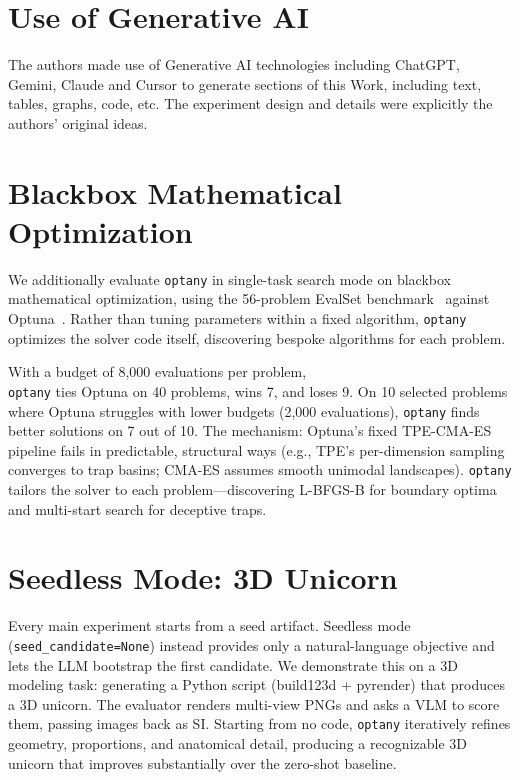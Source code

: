 \documentclass[sigconf,anonymous,review]{acmart}
\newcommand{\oa}{\texttt{optany}}
\newcommand{\asi}{SI}
\begin{document}
\newpage

\appendix

\section{Use of Generative AI}
The authors made use of Generative AI technologies including ChatGPT, Gemini, Claude and Cursor to generate sections of this Work, including text, tables, graphs, code, etc. The experiment design and details were explicitly the authors' original ideas.

\section{Blackbox Mathematical Optimization}\label{app:optuna}

We additionally evaluate \oa{} in single-task search mode on blackbox mathematical optimization, using the 56-problem EvalSet benchmark~\cite{evalset2018} against Optuna~\cite{akiba2019optuna}. Rather than tuning parameters within a fixed algorithm, \oa{} optimizes the solver code itself, discovering bespoke algorithms for each problem.

With a budget of 8,000 evaluations per problem, \\ \oa{} ties Optuna on 40 problems, wins 7, and loses 9. On 10 selected problems where Optuna struggles with lower budgets (2,000 evaluations), \oa{} finds better solutions on 7 out of 10. The mechanism: Optuna's fixed TPE-CMA-ES pipeline fails in predictable, structural ways (e.g., TPE's per-dimension sampling converges to trap basins; CMA-ES assumes smooth unimodal landscapes). \oa{} tailors the solver to each problem---discovering L-BFGS-B for boundary optima and multi-start search for deceptive traps.


\section{Seedless Mode: 3D Unicorn}\label{app:unicorn}

Every main experiment starts from a seed artifact. Seedless mode (\texttt{seed\_candidate=None}) instead provides only a natural-language objective and lets the LLM bootstrap the first candidate. We demonstrate this on a 3D modeling task: generating a Python script (build123d + pyrender) that produces a 3D unicorn. The evaluator renders multi-view PNGs and asks a VLM to score them, passing images back as \asi{}. Starting from no code, \oa{} iteratively refines geometry, proportions, and anatomical detail, producing a recognizable 3D unicorn that improves substantially over the zero-shot baseline.
\end{document}
